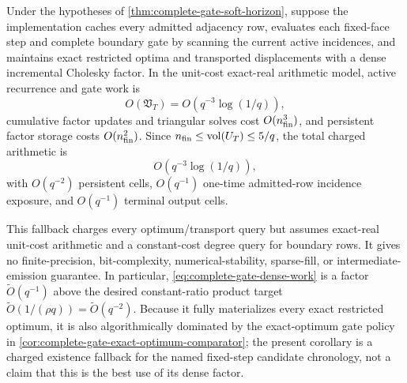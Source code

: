 \begin{corollary}
\label{cor:complete-gate-dense-fallback}
Under the hypotheses of \cref{thm:complete-gate-soft-horizon}, suppose the
implementation caches every admitted adjacency row, evaluates each fixed-face
step and complete boundary gate by scanning the current active incidences,
and maintains exact restricted optima and transported displacements with a
dense incremental Cholesky factor.  In the unit-cost exact-real arithmetic
model, active recurrence and gate work is
\begin{equation*}
 O(\mathfrak V_T)=O(q^{-3}\log(1/q)),
\end{equation*}
cumulative factor updates and triangular solves cost $O(n_{\rm fin}^3)$,
and persistent factor storage costs $O(n_{\rm fin}^2)$.  Since
$n_{\rm fin}\leq\operatorname{vol}(U_T)\leq5/q$, the total charged arithmetic is
\begin{equation}
 O(q^{-3}\log(1/q)),
 \label{eq:complete-gate-dense-work}
\end{equation}
with $O(q^{-2})$ persistent cells, $O(q^{-1})$ one-time admitted-row
incidence exposure, and $O(q^{-1})$ terminal output cells.

This fallback charges every optimum/transport query but assumes exact-real
unit-cost arithmetic and a constant-cost degree query for boundary rows.  It
gives no finite-precision, bit-complexity, numerical-stability, sparse-fill,
or intermediate-emission guarantee.  In particular,
\cref{eq:complete-gate-dense-work} is a factor
$\widetilde O(q^{-1})$ above the desired constant-ratio product target
$\widetilde O(1/(\rho q))=\widetilde O(q^{-2})$.
Because it fully materializes every exact restricted optimum, it is also
algorithmically dominated by the exact-optimum gate policy in
\cref{cor:complete-gate-exact-optimum-comparator}; the present corollary is a
charged existence fallback for the named fixed-step candidate chronology,
not a claim that this is the best use of its dense factor.
\end{corollary}

